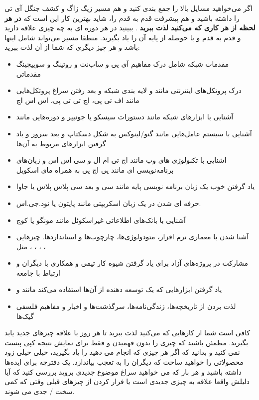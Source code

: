 اگر می‌خواهید مسایل بالا را جمع بندی کنید و هم مسیر زیگ زاگ و کشف جنگل آی تی را داشته باشید و هم پیشرفت قدم به قدم را، شاید بهترین کار این است که
\textbf{در هر لحظه از هر کاری که می‌کنید لذت ببرید}
. ببینید در هر دوره ای به چه چیزی علاقه دارید و قدم به قدم و با حوصله از پایه آن را یاد بگیرید. منطقا مسیر می‌تواند شامل اینها باشد و هر چیز دیگری که شما از آن لذت ببرید:
\begin{itemize}
\item مقدمات شبکه شامل درک مفاهیم آی پی و ساب‌نت و روتینگ و سوییچینگ مقدماتی
\item درک پروتکل‌های اینترنتی مانند 
و لایه بندی شبکه و بعد رفتن سراغ پروتکل‌هایی مانند اف تی پی، اچ تی تی پی، اس اس اچ
\item آشنایی با ابزارهای شبکه مانند دستورات سیسکو یا جونیپر و دوره‌هایی مانند 
\item آشنایی با سیستم عامل‌هایی مانند گنو/لینوکس به شکل دسکتاپ و بعد سرور و یاد گرفتن ابزارهای مربوط به آن‌ها
\item اشنایی با تکنولوژی های وب مانند اچ تی ام ال و سی اس اس و زبان‌های برنامه‌نویسی ای مانند پی اچ پی به همراه مای اسکویل
\item یاد گرفتن خوب یک زبان برنامه نویسی پایه مانند سی و بعد سی پلاس پلاس یا جاوا
\item حرفه ای شدن در یک زبان اسکریپتی مانند پایتون یا نود.جی.اس.
\item آشنایی با بانک‌های اطلاعاتی غیراسکوئل مانند مونگو یا کوچ
\item آشنا شدن با معماری نرم افزار، متودولوژی‌ها، چارچوب‌ها و استانداردها. چیزهایی مثل
، ، ، ، 
\item مشارکت در پروژه‌های آزاد برای یاد گرفتن شیوه کار تیمی و همکاری با دیگران و ارتباط با جامعه
\item یاد گرفتن ابزارهایی که یک توسعه دهنده از آن‌ها استفاده می‌کند مانند 
 و 
\item لذت بردن از تاریخچه‌ها، زندگی‌نامه‌ها، سرگذشت‌ها و اخبار و مفاهیم فلسفی گیک‌ها
\end{itemize}
کافی است شما از کارهایی که می‌کنید لذت ببرید تا هر روز با علاقه چیزهای جدید یابد بگیرید. مطمئن باشید که چیزی را بدون فهمیدن و فقط برای نمایش نتیجه کپی پیست نمی کنید و بدانید که اگر هر چیزی که انجام می دهید را یاد بگیرید، خیلی خیلی زود محصولاتی را خواهید ساخت که دیگران را به تعجب بیاندازد. یک دفترچه برای ایده‌ها داشته باشید و هر بار که می خواهید سراغ موضوع جدیدی بروید بررسی کنید که آیا دلیلش واقعا علاقه به چیزی جدیدی است یا فرار کردن از چیزهای قبلی وقتی که کمی سخت / جدی می شوند. 

